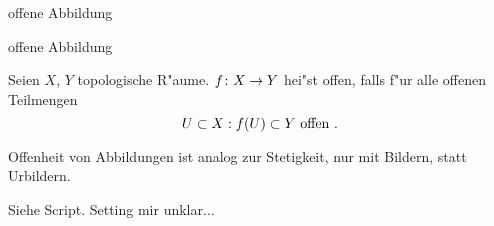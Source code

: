 \documentclass[class=article, crop=false]{standalone}
\begin{document}
\begin{zettel}{offene Abbildung}
\begin{flashcard}[koijo9me]{offene Abbildung}
	\begin{definition}
		Seien $X$, $Y$ topologische R"aume. $f \colon X\to Y$ hei"st offen, falls f"ur alle offenen Teilmengen
		\[
			U \subset X : f(U) \subset  Y \text{ offen }
		.\]
	\end{definition}
\end{flashcard}
\begin{remark}
	Offenheit von Abbildungen ist analog zur Stetigkeit, nur mit Bildern, statt Urbildern.
\end{remark}
\begin{corollary}
	Siehe Script. Setting mir unklar...
\end{corollary}
\end{zettel}
\end{document}
